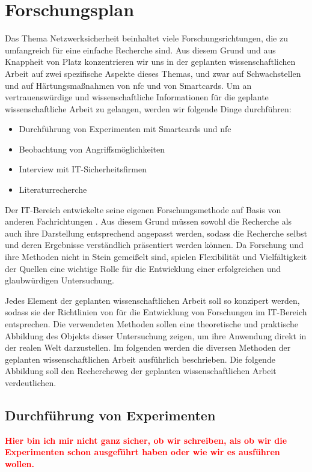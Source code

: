 \section{Forschungsplan}

Das Thema Netzwerksicherheit beinhaltet viele Forschungsrichtungen, die zu umfangreich für eine einfache
Recherche sind. Aus diesem Grund und aus Knappheit von Platz konzentrieren wir uns in der geplanten 
wissenschaftlichen Arbeit auf zwei spezifische Aspekte dieses Themas, und zwar auf Schwachstellen und 
auf Härtungsmaßnahmen von nfc und von Smartcards. Um an vertrauenswürdige und wissenschaftliche
Informationen für die geplante wissenschaftliche Arbeit zu gelangen, werden wir folgende Dinge durchführen:

\begin{itemize}
  \item Durchführung von Experimenten mit Smartcards und nfc
  \item Beobachtung von Angriffsmöglichkeiten
  \item Interview mit IT-Sicherheitsfirmen
  \item Literaturrecherche
\end{itemize}

Der IT-Bereich entwickelte seine eigenen Forschungsmethode auf Basis von anderen Fachrichtungen \cite{inbook:AHDS}.
Aus diesem Grund müssen sowohl die Recherche als auch ihre Darstellung entsprechend angepasst werden, sodass 
die Recherche selbst und deren Ergebnisse verständlich präsentiert werden können. Da Forschung und ihre Methoden
nicht in Stein gemeißelt sind, spielen Flexibilität und Vielfältigkeit der Quellen eine wichtige Rolle für die 
Entwicklung einer erfolgreichen und glaubwürdigen Untersuchung.


Jedes Element der geplanten wissenschaftlichen Arbeit soll so konzipert werden, sodass sie der Richtlinien von
\cite{refip:SGRM} für die Entwicklung von Forschungen im IT-Bereich entsprechen. Die verwendeten Methoden 
sollen eine theoretische und praktische Abbildung des Objekts dieser Untersuchung zeigen, um ihre Anwendung 
direkt in der realen Welt darzustellen. Im folgenden werden die diversen Methoden der geplanten wissenschaftlichen 
Arbeit ausführlich beschrieben. Die folgende Abbildung soll den Rechercheweg der geplanten wissenschaftlichen 
Arbeit verdeutlichen.



\subsection{Durchführung von Experimenten}
\textcolor{red}{\textbf{Hier bin ich mir nicht ganz sicher, ob wir schreiben, als ob wir die Experimenten 
schon ausgeführt haben oder wie wir es ausführen wollen.}}

